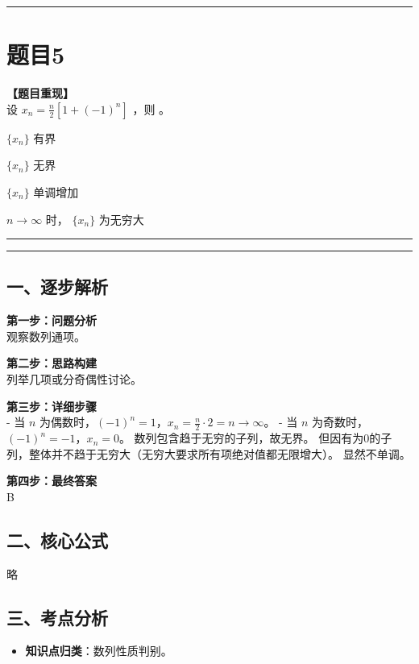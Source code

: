 \documentclass[12pt, a4paper]{ctexart}
\newcommand{\TopSeparator}{
    \par\noindent\rule{\textwidth}{1.5pt}\vspace{0.5em} %
}
\newcommand{\AnalysisSeparator}{
    \par\noindent\rule{\textwidth}{0.5pt}\vspace{0.2em}\hrule\vspace{0.5em} %
}
\newenvironment{RedAnalysis}{
    \par
    \color{red} %
}{
    \par
    \color{black} %
}
\newcommand{\choicesTwo}[4]{
    \begin{enumerate}[label=\Alph*., itemsep=0pt, parsep=0pt, topsep=5pt, labelsep=0.5em]
        \begin{minipage}{0.45\linewidth} \item #1 \end{minipage}
        \begin{minipage}{0.45\linewidth} \item #2 \end{minipage}
        \begin{minipage}{0.45\linewidth} \item #3 \end{minipage}
        \begin{minipage}{0.45\linewidth} \item #4 \end{minipage}
    \end{enumerate}
}
\begin{document}
\vspace{2em}

\TopSeparator
\section*{题目5}

\textbf{【题目重现】} \\
设 $ x_{n}=\frac{n}{2}[1+(-1)^{n}] $ ，则 \underline{\hspace{1cm}}。
\choicesTwo
    {$ \{x_{n}\} $ 有界}
    {$ \{x_{n}\} $ 无界}
    {$ \{x_{n}\} $ 单调增加}
    {$ n\to\infty $ 时， $ \{x_{n}\} $ 为无穷大}

\AnalysisSeparator

\begin{RedAnalysis}

\subsection*{一、逐步解析}

\textbf{第一步：问题分析} \\
观察数列通项。

\textbf{第二步：思路构建} \\
列举几项或分奇偶性讨论。

\textbf{第三步：详细步骤} \\
- 当 $n$ 为偶数时，$(-1)^n = 1$，$x_n = \frac{n}{2} \cdot 2 = n \to \infty$。
- 当 $n$ 为奇数时，$(-1)^n = -1$，$x_n = 0$。
数列包含趋于无穷的子列，故无界。
但因有为0的子列，整体并不趋于无穷大（无穷大要求所有项绝对值都无限增大）。
显然不单调。

\textbf{第四步：最终答案} \\
B

\subsection*{二、核心公式}
略

\subsection*{三、考点分析}
\begin{itemize}
    \item \textbf{知识点归类}：数列性质判别。
\end{itemize}

\end{RedAnalysis}

\vspace{2em}
\end{document}
